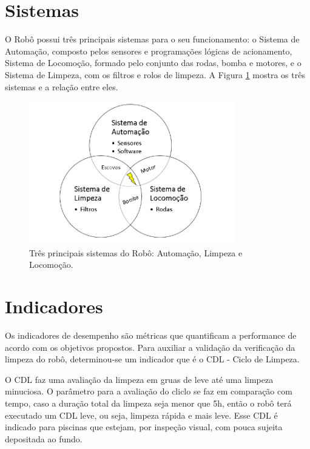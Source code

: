\section{Sistemas}
O Robô possui três principais sistemas para o seu funcionamento: o Sistema de Automação, composto pelos sensores e programações lógicas de acionamento, Sistema de Locomoção, formado pelo conjunto das rodas, bomba e motores, e o Sistema de Limpeza, com os filtros e rolos de limpeza. A Figura \ref{fig:main-system-project} mostra os três sistemas e a relação entre eles.
\par
  \begin{figure}[h]
    \centering
    \includegraphics[width=0.8\textwidth]{figures/main-system-project.png}
    \caption{Três principais sistemas do Robô: Automação, Limpeza e Locomoção.}
    \label{fig:main-system-project}
  \end{figure}
  \FloatBarrier
\par

\section{Indicadores}
Os indicadores de desempenho são métricas que quantificam a performance de acordo com os objetivos propostos. Para auxiliar a validação da verificação da limpeza do robô, determinou-se um indicador que é o \textsf{CDL} - Ciclo de Limpeza.

O \textsf{CDL} faz uma avaliação da limpeza em gruas de leve até uma limpeza minuciosa. O parâmetro para a avaliação do cliclo se faz em comparação com tempo, caso a duração total da limpeza seja menor que 5h, então o robô terá executado um \textsf{CDL} leve, ou seja, limpeza rápida e mais leve. Esse \textsf{CDL} é indicado para piscinas que estejam, por inspeção visual, com pouca sujeita depositada ao fundo.

